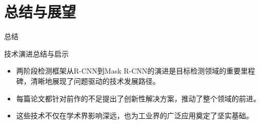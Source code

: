 \documentclass{beamer}
\begin{document}
\section{总结与展望}
\begin{frame}{总结}
    \begin{block}{技术演进总结与启示}
        \begin{itemize}
            \item 两阶段检测框架从R-CNN到Mask R-CNN的演进是目标检测领域的重要里程碑，清晰地展现了问题驱动的技术发展路径。
            \item 每篇论文都针对前作的不足提出了创新性解决方案，推动了整个领域的前进。
            \item 这些技术不仅在学术界影响深远，也为工业界的广泛应用奠定了坚实基础。
        \end{itemize}
    \end{block}
\end{frame}
\end{document}
